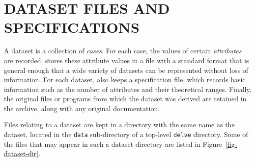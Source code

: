 %
%
\newpage

\section{DATASET FILES AND SPECIFICATIONS}\label{sec-data}
\thispagestyle{plain}
\setcounter{figure}{0}

A dataset is a collection of \emph{cases}.  For each case, the values
of certain \emph{attributes} are recorded.  \delve{} stores these
attribute values in a file with a standard format that is general
enough that a wide variety of datasets can be represented without loss
of information.  For each dataset, \delve{} also keeps a specification
file, which records basic information such as the number of attributes
and their theoretical ranges.  Finally, the original files or programs
from which the dataset was derived are retained in the \delve{}
archive, along with any original documentation.

Files relating to a dataset are kept in a directory with the same name
as the dataset, located in the {\tt data} sub-directory of a top-level
{\tt delve} directory.  Some of the files that may appear in such a 
dataset directory are listed in Figure~\ref{fig-dataset-dir}.


